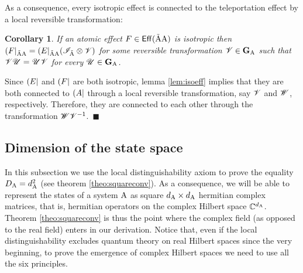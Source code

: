 \documentclass[12pt,aps,pra,showpacs,groupedaddress]{revtex4-1}
\newtheorem{corollary}{Corollary} \newtheorem{theorem}{Theorem}
\def\Proof{\medskip\par\noindent{\bf Proof. }}
\def\qed{$\,\blacksquare$\par}
\def\Cmplx{\mathbb C}
\def\tW{\trnsfrm W}\def\tM{\trnsfrm M}\def\tX{\trnsfrm X}
\def\Cntset{{\mathsf{Eff}}}
\def\grp#1{{\mathbf{#1}}} \def\Span{\mathsf{Span}}
\begin{document}
As a consequence, every isotropic effect is connected to the teleportation effect by a local
reversible transformation:
\begin{corollary}
  If an atomic effect $F\in\Cntset (\tilde \rA\rA)$ is isotropic
  then $(F|_{\tilde {{\rm A}}{\rm A}}=(E|_{\tilde {{\rm A}}{\rm A}}(\mathscr I_{\tilde{{\rm A}}}\otimes
  \mathscr V)$ for some reversible transformation $\tV\in\grp G_\rA$ such
  that $\mathscr V \mathscr U = \mathscr U \mathscr V$ for every $\tU \in \grp G_\rA$.
  \label{cor:isoeff2}
\end{corollary}
\Proof Since $\left(E\right|$ and $\left(F\right|$ are both isotropic, lemma \ref{lem:isoeff} implies that they are both connected to $\left(A\right|$ through a local reversible transformation, say $\mathscr V$ and $\tW$, respectively. Therefore, they are connected to each other through the transformation $\tW\tV^{-1}$. \qed

\subsection{Dimension of the state space}
In this subsection we use the local distinguishability axiom to prove the equality $D_{\rm A} =
d_{\rm A}^2$ (see theorem \ref{theo:squareconv}). As a consequence,
we will be able to represent the states of a system ${\rm A}$ as square $d_{\rm A}\times d_{\rm A}$ hermitian complex
matrices, that is, hermitian operators on the complex Hilbert space $\Cmplx^{d_\rA}$.  Theorem \ref{theo:squareconv}
is thus the point where the complex field (as opposed to the real field)  enters in our derivation.  Notice that, even if the local distinguishability excludes quantum theory on real Hilbert spaces since the very beginning,  to prove the emergence of complex Hilbert spaces we need to use all the six principles.  
\end{document}
